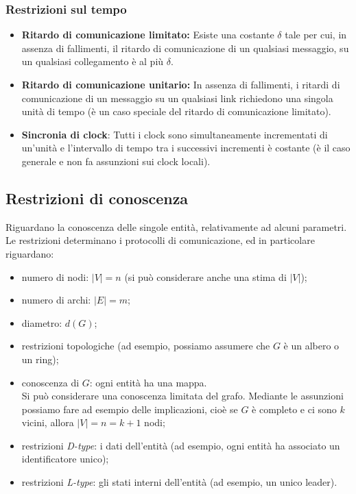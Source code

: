 \subsubsection{Restrizioni sul tempo}
\begin{itemize}
    \item \textbf{Ritardo di comunicazione limitato:} Esiste una costante $\delta$ tale per cui, in assenza di fallimenti, il ritardo di comunicazione di un qualsiasi messaggio, su un qualsiasi collegamento è al più $\delta$.
    \item \textbf{Ritardo di comunicazione unitario:} In assenza di fallimenti, i ritardi di comunicazione di un messaggio su un qualsiasi link richiedono una singola unità di tempo (è un caso speciale del ritardo di comunicazione limitato).
    \item \textbf{Sincronia di clock}: Tutti i clock sono simultaneamente incrementati di un'unità e l'intervallo di tempo tra i successivi incrementi è costante (è il caso generale e non fa assunzioni sui clock locali). 
\end{itemize}

\subsection{Restrizioni di conoscenza}
Riguardano la conoscenza delle singole entità, relativamente ad alcuni parametri. \\ 
Le restrizioni determinano i protocolli di comunicazione, ed in particolare riguardano:
\begin{itemize}
  \item numero di nodi: $|V| = n$ (si può considerare anche una stima di $|V|$);
  \item numero di archi: $|E| = m$;
  \item diametro: $d(G)$;
  \item restrizioni topologiche (ad esempio, possiamo assumere che $G$ è un albero o un ring);
  \item conoscenza di $G$: ogni entità ha una mappa. \\ Si può considerare una conoscenza limitata del grafo. Mediante le assunzioni possiamo fare ad esempio delle implicazioni, cioè se $G$ è completo e ci sono $k$ vicini, allora $|V| = n = k+1$ nodi;
  \item restrizioni \textit{D-type}: i dati dell'entità (ad esempio, ogni entità ha associato un identificatore unico);
  \item restrizioni \textit{L-type}: gli stati interni dell'entità (ad esempio, un unico leader).
\end{itemize}


